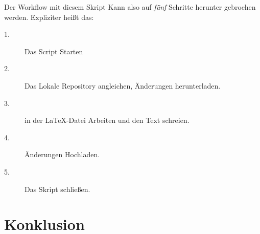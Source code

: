 \documentclass[12pt,a4paper]{scrartcl}
\begin{document}
Der Workflow mit diesem Skript Kann also auf \emph{fünf} Schritte herunter gebrochen werden. Expliziter heißt das:
\begin{description}
\item[1.] Das Script Starten
\item[2.] Das Lokale Repository angleichen, Änderungen herunterladen.
\item[3.] in der \LaTeX -Datei Arbeiten und den Text schreien.
\item[4.] Änderungen Hochladen.
\item[5.] Das Skript schließen.
\end{description}

\section{Konklusion}
\end{document}
